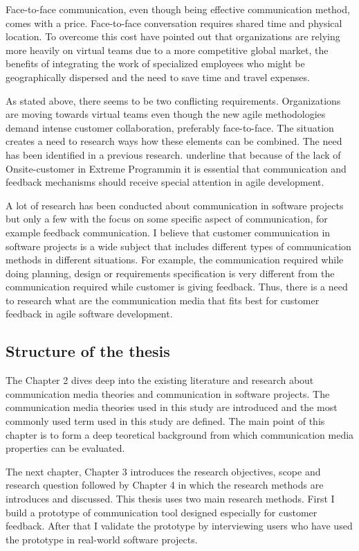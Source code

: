 \documentclass[english,12pt,a4paper,pdftex]{article}
\begin{document}
Face-to-face communication, even though being effective communication method, comes with a price. Face-to-face conversation requires shared time and physical location. To overcome this cost \citet{derosa2004} have pointed out that organizations are relying more heavily on virtual teams due to a more competitive global market, the benefits of integrating the work of specialized employees who might be geographically dispersed and the need to save time and travel expenses. 

As stated above, there seems to be two conflicting requirements. Organizations are moving towards virtual teams even though the new agile methodologies demand intense customer collaboration, preferably face-to-face. The situation creates a need to research ways how these elements can be combined. The need has been identified in a previous research. \citet{korkala2006} underline that because of the lack of Onsite-customer in Extreme Programmin it is essential that communication and feedback mechanisms should receive special attention in agile development.

A lot of research has been conducted about communication in software projects but only a few with the focus on some specific aspect of communication, for example feedback communication. I believe that customer communication in software projects is a wide subject that includes different types of communication methods in different situations. For example, the communication required while doing planning, design or requirements specification is very different from the communication required while customer is giving feedback. Thus, there is a need to research what are the communication media that fits best for customer feedback in agile software development.

\subsection{Structure of the thesis}

The Chapter 2 dives deep into the existing literature and research about communication media theories and communication in software projects. The communication media theories used in this study are introduced and the most commonly used term used in this study are defined. The main point of this chapter is to form a deep teoretical background from which communication media properties can be evaluated.

The next chapter, Chapter 3 introduces the research objectives, scope and research question followed by Chapter 4 in which the research methods are introduces and discussed. This thesis uses two main research methods. First I build a  prototype of communication tool designed especially for customer feedback. After that I validate the prototype by interviewing users who have used the prototype in real-world software projects.
\end{document}
